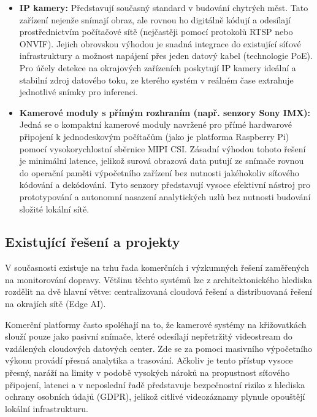 \documentclass[male,czech,api_bc]{kitheses}
\begin{document}
\begin{itemize}
    \item \textbf{\acs{IP} kamery:} Představují současný standard v budování chytrých měst. Tato zařízení nejenže snímají obraz, ale rovnou ho digitálně kódují a odesílají prostřednictvím počítačové sítě (nejčastěji pomocí protokolů \acs{RTSP} nebo \acs{ONVIF}). Jejich obrovskou výhodou je snadná integrace do existující síťové infrastruktury a možnost napájení přes jeden datový kabel (technologie \acs{PoE}). Pro účely detekce na okrajových zařízeních poskytují \acs{IP} kamery ideální a stabilní zdroj datového toku, ze kterého systém v reálném čase extrahuje jednotlivé snímky pro inferenci.
    
    \item \textbf{Kamerové moduly s přímým rozhraním (např. senzory Sony IMX):} Jedná se o kompaktní kamerové moduly navržené pro přímé hardwarové připojení k jednodeskovým počítačům (jako je platforma Raspberry Pi) pomocí vysokorychlostní sběrnice MIPI CSI. Zásadní výhodou tohoto řešení je minimální latence, jelikož surová obrazová data putují ze snímače rovnou do operační paměti výpočetního zařízení bez nutnosti jakéhokoliv síťového kódování a dekódování. Tyto senzory představují vysoce efektivní nástroj pro prototypování a autonomní nasazení analytických uzlů bez nutnosti budování složité lokální sítě.
\end{itemize}

\subsection{Existující řešení a projekty}
V současnosti existuje na trhu řada komerčních i výzkumných řešení zaměřených na monitorování dopravy. Většinu těchto systémů lze z architektonického hlediska rozdělit na dvě hlavní větve: centralizovaná cloudová řešení a distribuovaná řešení na okrajích sítě (Edge AI).

Komerční platformy často spoléhají na to, že kamerové systémy na křižovatkách slouží pouze jako pasivní snímače, které odesílají nepřetržitý videostream do vzdálených cloudových datových center. Zde se za pomoci masivního výpočetního výkonu provádí přesná analytika a trasování. Ačkoliv je tento přístup vysoce přesný, naráží na limity v podobě vysokých nároků na propustnost síťového připojení, latenci a v neposlední řadě představuje bezpečnostní riziko z hlediska ochrany osobních údajů (GDPR), jelikož citlivé videozáznamy plynule opouštějí lokální infrastrukturu.
\end{document}
